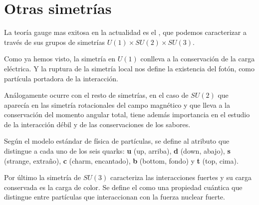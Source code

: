 \section{Otras simetrías}\label{sec:otras-simetrias}

La teoría gauge mas exitosa en la actualidad es el , que podemos caracterizar a través de sus grupos de simetrías $U(1)\times SU(2)\times SU(3)$.

Como ya hemos visto, la simetría en $U(1)$ conlleva a la conservación de la carga eléctrica. Y la ruptura de la simetría local nos define la existencia del fotón, como partícula portadora de la interacción.

Análogamente ocurre con el resto de simetrías, en el caso de $SU(2)$ que aparecía en las simetría rotacionales del campo magnético y que lleva a la conservación del momento angular total, tiene además importancia en el estudio de la interacción débil y de las conservaciones de los sabores\autocite[107]{ISMPP}.

Según el modelo estándar de física de partículas, se define  al atributo que distingue a cada uno de los seis quarks: \textbf{u} (up, arriba), \textbf{d} (down, abajo), \textbf{s} (strange, extraño), \textbf{c} (charm, encantado), \textbf{b} (bottom, fondo) y \textbf{t} (top, cima).


Por último la simetría de $SU(3)$ caracteriza las interacciones fuertes y su carga conservada es la carga de color. Se define el  como una propiedad cuántica que distingue entre partículas que interaccionan con la fuerza nuclear fuerte.

